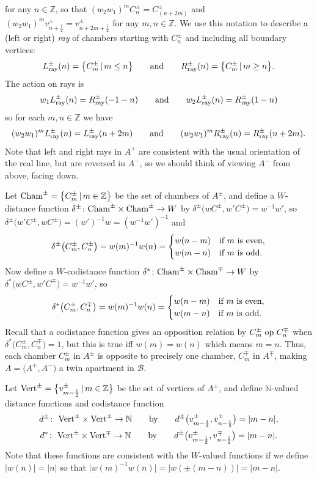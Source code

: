\documentclass[pdftex]{sigma}
\numberwithin{equation}{section}
\def\Z{\mathbb{Z}}
\def\N{\mathbb{N}}
\def\cB{\mathcal B}
\begin{document}
for any $n\in\Z$, so that $(w_2 w_1)^m C^\pm_n = C^\pm_{(n+2m)}$ and $(w_2 w_1)^m v^\pm_{n+\frac{1}{2}} =
v^\pm_{n+2m+\frac{1}{2}}$ for any $m,n\in\Z$.
We use this notation to describe a (left or right) {\it ray} of chambers starting with $C^\pm_n$ and including all boundary vertices:
\[L^\pm_{\rm ray}(n) = \big\{C^\pm_m\, |\, m\leq n\big\} \qquad\hbox{and}\qquad R^\pm_{\rm ray}(n) = \big\{C^\pm_m\, |\, m\geq n\big\} .\]
The action on rays is
\[w_1 L^\pm_{\rm ray}(n) = R^\pm_{\rm ray}(-1-n) \qquad\hbox{and}\qquad w_2 L^\pm_{\rm ray}(n) = R^\pm_{\rm ray}(1-n) \]
so for each $m,n\in\Z$ we have
\[(w_2 w_1)^m L^\pm_{\rm ray}(n) = L^\pm_{\rm ray}(n+2m) \qquad\hbox{and}\qquad (w_2 w_1)^m R^\pm_{\rm ray}(n) = R^\pm_{\rm ray}(n+2m) .\]
Note that left and right rays in $A^+$ are consistent with the usual orientation of the real line, but are reversed in
$A^-$, so we should think of viewing $A^-$ from above, facing down.

Let ${\rm Cham}^\pm = \big\{C^\pm_m\,|\, m\in\Z\big\}$ be the set of chambers of $A^\pm$, and define a $W$-distance function
$\delta^\pm\colon {\rm Cham}^\pm \times {\rm Cham}^\pm \to W$ by $\delta^\pm\big(w C^\pm,w' C^\pm\big) = w^{-1} w'$, so
$\delta^\pm\big(w' C^\pm,w C^\pm\big) = (w')^{-1} w = (w^{-1} w')^{-1}$ and
\[\delta^\pm\big(C^\pm_m,C^\pm_n\big) = w(m)^{-1} w(n)
= \begin{cases} w(n-m)& \hbox{if $m$ is even},\\ w(m-n)& \hbox{if $m$ is odd}.\end{cases}\]
Now define a $W$-codistance function
$\delta^*\colon {\rm Cham}^\pm \times {\rm Cham}^\mp \to W$ by $\delta^*\big(w C^\pm,w' C^\mp\big) = w^{-1} w'$, so
\[\delta^*\big(C^\pm_m,C^\mp_n\big) = w(m)^{-1} w(n)
= \begin{cases} w(n-m)& \hbox{if $m$ is even},\\ w(m-n)& \hbox{if $m$ is odd}.\end{cases}\]
Recall that a codistance function gives an opposition relation by $C^\pm_m\ {\rm op}\ C^\mp_n$ when $\delta^*\big(C^\pm_m,C^\mp_n\big) = 1$, but this is true iff $w(m) = w(n)$ which means $m = n$. Thus, each chamber $C^\pm_m$ in $A^\pm$ is opposite to precisely one chamber, $C^\mp_m$ in $A^\mp$, making $A = \big(A^+,A^-\big)$ a twin apartment in $\cB$.

Let ${\rm Vert}^\pm = \big\{v^\pm_{m-\frac{1}{2}}\,|\, m\in\Z\big\}$ be the set of vertices of $A^\pm$, and define $\N$-valued distance
functions and codistance function
\begin{gather*}
d^\pm\colon \ {\rm Vert}^\pm \times {\rm Vert}^\pm \to \N\qquad \hbox{by}\qquad d^\pm\big(v^\pm_{m-\frac{1}{2}},v^\pm_{n-\frac{1}{2}}\big) = |m-n|,\\
d^*\colon \ {\rm Vert}^\pm \times {\rm Vert}^\mp \to \N\qquad \hbox{by}\qquad d^\pm\big(v^\pm_{m-\frac{1}{2}},v^\mp_{n-\frac{1}{2}}\big) = |m-n|.\end{gather*}
Note that these functions are consistent with the $W$-valued functions if we define $|w(n)| = |n|$ so that
$\big|w(m)^{-1} w(n)\big| = |w(\pm(m-n))| = |m-n|$.
\end{document}
